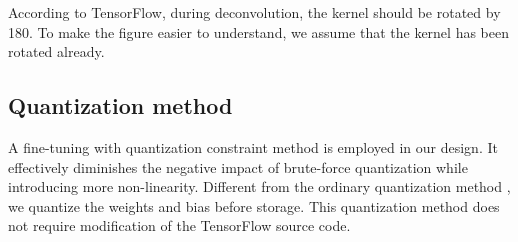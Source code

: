 \documentclass[conference]{IEEEtran}
\begin{document}
According to TensorFlow, during deconvolution, the kernel should be rotated by 180\degree. To make the figure easier to understand, we assume that the kernel has been rotated already.

\begin{comment}
    \begin{equation}
        \begin{split}
        OF_{11} = & IF_{11}\cdot K_{11}+IF_{12}\cdot K_{13} \\
        & +IF_{21}\cdot K_{31}+IF_{22}\cdot K_{33}
        \label{eq:deconv_1}
        \end{split}
    \end{equation}
    \begin{equation}
        OF_{12} = IF_{12}\cdot K_{12}+IF_{22}\cdot K_{32}
        \label{eq:deconv_2}
    \end{equation}
    \begin{equation}
        OF_{21} = IF_{21}\cdot K_{21}+IF_{22}\cdot K_{23}
        \label{eq:deconv_3}
    \end{equation}
    \begin{equation}
        OF_{22} = IF_{22}\cdot K_{22}
        \label{eq:deconv_4}
    \end{equation}
\end{comment}

\begin{comment}
From hardware perspective, these four equations require 9 multiplications and 5 additions, which means we can reuse the architecture of convolution process element described in the previous section.
\end{comment}

\subsection{Quantization method}
A fine-tuning with quantization constraint method \cite{ref:yecheng_tcas_2019} is employed in our design. It effectively diminishes the negative impact of brute-force quantization while introducing more non-linearity. Different from the ordinary quantization method \cite{ref:google_quant}, we quantize the weights and bias before storage. This quantization method does not require modification of the TensorFlow source code.
\begin{comment}
    As illustrated in Fig.~\ref{fig:quant}, d\textcolor{red}{what is the benefit?}
\begin{figure}[htbp]
	\centering
	\texttt{[image: fig/quant.png]}
	\caption{Quantization scheme}
	\label{fig:quant}
\end{figure}
\end{comment}
\end{document}
